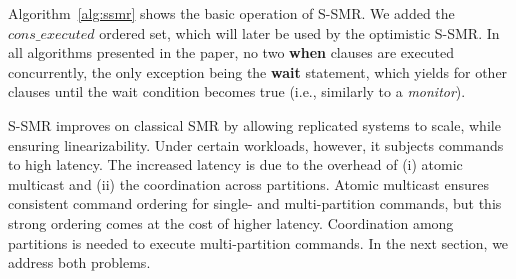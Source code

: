 %


Algorithm~\ref{alg:ssmr} shows the basic operation of S-SMR. 
We added the $cons\_executed$ ordered set, which will later be used by the optimistic S-SMR.
In all algorithms presented in the paper, no two \textbf{when} clauses are executed concurrently, the only exception being the \textbf{wait} statement, which yields for other clauses until the wait condition becomes true (i.e., similarly to a \emph{monitor}).

S-SMR improves on classical SMR by allowing replicated systems to scale, while ensuring linearizability. 
Under certain workloads, however, it subjects commands to high latency. 
The increased latency is due to the overhead of (i) atomic multicast and (ii) the coordination across partitions. 
Atomic multicast ensures consistent command ordering for single- and multi-partition commands, but this strong ordering comes at the cost of higher latency. 
Coordination among partitions is needed to execute multi-partition commands.
%
In the next section, we address both problems.

